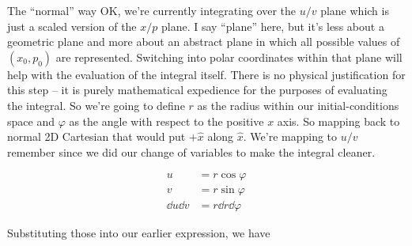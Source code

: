 \begin{answer}
\begin{answerpart}{The ``normal'' way}
    OK, we're currently integrating over the $u/v$ plane which is just
    a scaled version of the $x/p$ plane.  I say ``plane'' here, but
    it's less about a geometric plane and more about an abstract plane
    in which all possible values of $(x_0, p_0)$ are represented.
    Switching into polar coordinates within that plane will help with
    the evaluation of the integral itself.  There is no physical
    justification for this step -- it is purely mathematical
    expedience for the purposes of evaluating the integral.  So we're
    going to define $r$ as the radius within our initial-conditions
    space and $\varphi$ as the angle with respect to the positive $x$
    axis.  So mapping back to normal 2D Cartesian that would put
    $+\hat{x}$ along $\hat{x}$.  We're mapping to $u/v$ remember since
    we did our change of variables to make the integral cleaner.

    \begin{equation}
      \begin{split}
        u &= r\cos{\varphi}\\
        v &= r\sin{\varphi}\\
        \dd{u} \dd{v} &= r \dd{r} \dd{\varphi}
      \end{split}
    \end{equation}

    Substituting those into our earlier expression, we have


\end{answerpart}
\end{answer}
